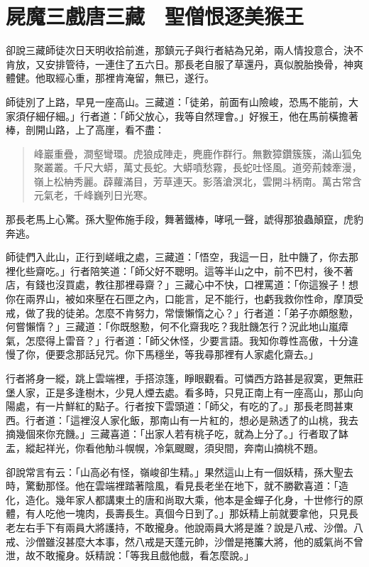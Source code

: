 
\chapter{屍魔三戲唐三藏　聖僧恨逐美猴王}

卻說三藏師徒次日天明收拾前進，那鎮元子與行者結為兄弟，兩人情投意合，決不肯放，又安排管待，一連住了五六日。那長老自服了草還丹，真似脫胎換骨，神爽體健。他取經心重，那裡肯淹留，無已，遂行。

師徒別了上路，早見一座高山。三藏道：「徒弟，前面有山險峻，恐馬不能前，大家須仔細仔細。」行者道：「師父放心，我等自然理會。」好猴王，他在馬前橫擔著棒，剖開山路，上了高崖，看不盡：
\begin{quote}
峰巖重疊，澗壑彎環。虎狼成陣走，麂鹿作群行。無數獐鑽簇簇，滿山狐兔聚叢叢。千尺大蟒，萬丈長蛇。大蟒噴愁霧，長蛇吐怪風。道旁荊棘牽漫，嶺上松柟秀麗。薜蘿滿目，芳草連天。影落滄溟北，雲開斗柄南。萬古常含元氣老，千峰巍列日光寒。
\end{quote}

那長老馬上心驚。孫大聖佈施手段，舞著鐵棒，哮吼一聲，諕得那狼蟲顛竄，虎豹奔逃。

師徒們入此山，正行到嵯峨之處，三藏道：「悟空，我這一日，肚中饑了，你去那裡化些齋吃。」行者陪笑道：「師父好不聰明。這等半山之中，前不巴村，後不著店，有錢也沒買處，教往那裡尋齋？」三藏心中不快，口裡罵道：「你這猴子！想你在兩界山，被如來壓在石匣之內，口能言，足不能行，也虧我救你性命，摩頂受戒，做了我的徒弟。怎麼不肯努力，常懷懶惰之心？」行者道：「弟子亦頗慇懃，何嘗懶惰？」三藏道：「你既慇懃，何不化齋我吃？我肚饑怎行？況此地山嵐瘴氣，怎麼得上雷音？」行者道：「師父休怪，少要言語。我知你尊性高傲，十分違慢了你，便要念那話兒咒。你下馬穩坐，等我尋那裡有人家處化齋去。」

行者將身一縱，跳上雲端裡，手搭涼篷，睜眼觀看。可憐西方路甚是寂寞，更無莊堡人家，正是多逢樹木，少見人煙去處。看多時，只見正南上有一座高山，那山向陽處，有一片鮮紅的點子。行者按下雲頭道：「師父，有吃的了。」那長老問甚東西。行者道：「這裡沒人家化飯，那南山有一片紅的，想必是熟透了的山桃，我去摘幾個來你充饑。」三藏喜道：「出家人若有桃子吃，就為上分了。」行者取了缽盂，縱起祥光，你看他觔斗幌幌，冷氣颼颼，須臾間，奔南山摘桃不題。

卻說常言有云：「山高必有怪，嶺峻卻生精。」果然這山上有一個妖精，孫大聖去時，驚動那怪。他在雲端裡踏著陰風，看見長老坐在地下，就不勝歡喜道：「造化，造化。幾年家人都講東土的唐和尚取大乘，他本是金蟬子化身，十世修行的原體，有人吃他一塊肉，長壽長生。真個今日到了。」那妖精上前就要拿他，只見長老左右手下有兩員大將護持，不敢攏身。他說兩員大將是誰？說是八戒、沙僧。八戒、沙僧雖沒甚麼大本事，然八戒是天蓬元帥，沙僧是捲簾大將，他的威氣尚不曾泄，故不敢攏身。妖精說：「等我且戲他戲，看怎麼說。」


